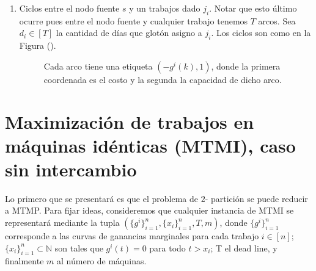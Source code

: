 \documentclass[10pt]{article}
\newcommand{\N}{\mathbb N}
\theoremstyle{plain}
\theoremstyle{definition}
\begin{document}
\begin{enumerate}
\item  Ciclos entre el nodo fuente $s$ y un trabajos dado $j_i$. Notar que esto último ocurre pues entre el nodo fuente y cualquier trabajo tenemos $T$ arcos. Sea $d_i \in [T]$ la cantidad de días que glotón asigno a $j_i$. Los ciclos son como en la Figura ().
  \begin{figure}[H]
\captionsetup{justification=centering,margin=2cm}
\begin{center}
\end{center}
\caption{Cada arco tiene una etiqueta $(-g^i(k),1)$, donde la primera coordenada es el costo y la segunda la capacidad de dicho arco.}
\label{fig:sourceWorkResid}
\end{figure} 
\end{enumerate}

\newpage
\section{Maximización de trabajos en máquinas idénticas (MTMI), caso sin intercambio}

Lo primero que se presentará es que el problema de $2$- partición se puede reducir a MTMP. Para fijar ideas, consideremos que cualquier instancia de MTMI se representará mediante la tupla $(\{g^i\}_{i=1}^n,\{x_i\}_{i=1}^n, T, m)$, donde $\{g^i\}_{i=1}^n$ corresponde a las curvas de ganancias marginales para cada trabajo $i \in [n]$; $\{x_i\}_{i=1}^n \subset \N$ son tales que $g^i(t) = 0$ para todo $t>x_i$; T el dead line, y finalmente $m$ al número de máquinas.\\~\\
\end{document}
